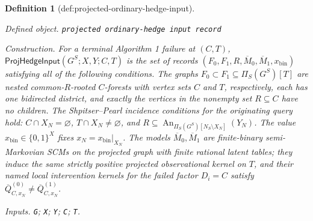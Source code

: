 \documentclass{article}
\newtheorem{definition}{Definition}
\begin{document}
\begin{definition}[def:projected-ordinary-hedge-input]\label{def:projected-ordinary-hedge-input}
\par\smallskip\noindent\emph{Defined object.} \texttt{projected ordinary-\allowbreak{}hedge input record}
\par\smallskip\noindent\emph{Construction.} For a terminal Algorithm 1 failure at \((C,T)\), \(\mathsf{ProjHedgeInput}(G^S;X,Y;C,T)\) is the set of records \((F_0,F_1,R,\overline M_0,\overline M_1,x_{\mathrm{bin}})\) satisfying all of the following conditions. The graphs \(F_0\subset F_1\subseteq\Pi_S(G^S)[T]\) are nested common-\(R\)-rooted \(C\)-forests with vertex sets \(C\) and \(T\), respectively, each has one bidirected district, and exactly the vertices in the nonempty set \(R\subseteq C\) have no children. The Shpitser--Pearl incidence conditions for the originating query hold: \(C\cap X_N=\varnothing\), \(T\cap X_N\ne\varnothing\), and \(R\subseteq\operatorname{An}_{\Pi_S(G^S)[N_S\setminus X_N]}(Y_N)\). The value \(x_{\mathrm{bin}}\in\{0,1\}^{X}\) fixes \(x_N=x_{\mathrm{bin}}|_{X_N}\). The models \(\overline M_0,\overline M_1\) are finite-binary semi-Markovian SCMs on the projected graph with finite rational latent tables; they induce the same strictly positive projected observational kernel on \(T\), and their named local intervention kernels for the failed factor \(D_i=C\) satisfy \(\overline Q^{(0)}_{C,x_N}\ne\overline Q^{(1)}_{C,x_N}\).
\par\smallskip\noindent\emph{Inputs.} \texttt{G}; \texttt{X}; \texttt{Y}; \texttt{C}; \texttt{T}.
\end{definition}
\end{document}
